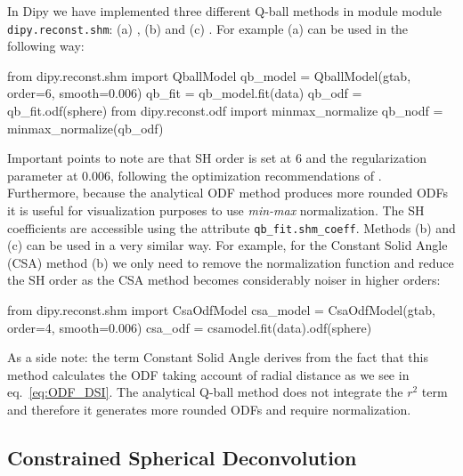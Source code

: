 \documentclass{bioinfo}
\begin{document}
In Dipy we have implemented three different Q-ball methods in module
module \texttt{dipy.reconst.shm}: (a)
\citet{descoteaux-angelino-etal:07}, (b) \citet{aganj-lenglet-etal:10}
and (c) \citet{tristan-vega-westin-etal:09}. For
example (a) can be used in the following way:
\begin{python}
from dipy.reconst.shm import QballModel
qb_model = QballModel(gtab, order=6, smooth=0.006)
qb_fit = qb_model.fit(data)
qb_odf = qb_fit.odf(sphere)
from dipy.reconst.odf import minmax_normalize
qb_nodf = minmax_normalize(qb_odf)
\end{python}
Important points to note are that SH order is set at $6$ and the regularization
parameter at $0.006$, following the optimization recommendations of
\citet{descoteaux-angelino-etal:06c}. Furthermore, because the
analytical ODF method produces more
rounded ODFs it is useful for visualization purposes to use \emph{min-max}
normalization. The SH coefficients are accessible using the attribute
\texttt{qb\_fit.shm\_coeff}. Methods (b) and (c) can be used in a very similar
way. For example, for the Constant Solid Angle (CSA)
\citep{aganj-lenglet-etal:10} method (b) we only need to remove the
normalization function and reduce the SH order as the CSA method becomes
considerably noiser in higher orders:
\begin{python}
from dipy.reconst.shm import CsaOdfModel
csa_model = CsaOdfModel(gtab, order=4,
                        smooth=0.006)
csa_odf = csamodel.fit(data).odf(sphere)
\end{python}
As a side note: the term Constant Solid Angle derives from the fact that this
method calculates the ODF taking account of radial distance as we see in
eq.~\ref{eq:ODF_DSI}. The analytical Q-ball method does not integrate the $r^2$
term and therefore it generates more rounded ODFs and require normalization.

\subsection{Constrained Spherical Deconvolution}
\end{document}
